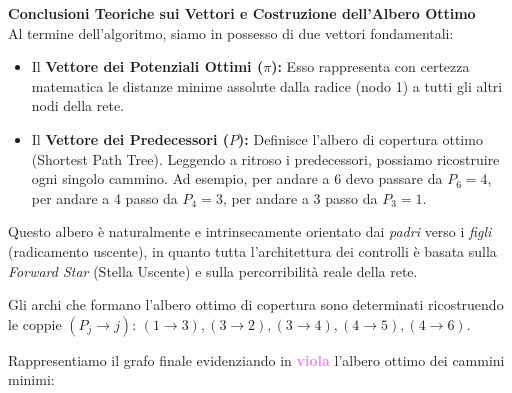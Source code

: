 \documentclass[12pt, a4paper]{article}
\begin{document}
	\textbf{Conclusioni Teoriche sui Vettori e Costruzione dell'Albero Ottimo}\\
	Al termine dell'algoritmo, siamo in possesso di due vettori fondamentali:
	\begin{itemize}
		\item Il \textbf{Vettore dei Potenziali Ottimi ($\pi$):} Esso rappresenta con certezza matematica le distanze minime assolute dalla radice (nodo 1) a tutti gli altri nodi della rete.
		\item Il \textbf{Vettore dei Predecessori ($P$):} Definisce l'albero di copertura ottimo (Shortest Path Tree). Leggendo a ritroso i predecessori, possiamo ricostruire ogni singolo cammino. Ad esempio, per andare a 6 devo passare da $P_6=4$, per andare a 4 passo da $P_4=3$, per andare a 3 passo da $P_3=1$.
	\end{itemize}
	Questo albero è naturalmente e intrinsecamente orientato dai \textit{padri} verso i \textit{figli} (radicamento uscente), in quanto tutta l'architettura dei controlli è basata sulla \textit{Forward Star} (Stella Uscente) e sulla percorribilità reale della rete.
	
	Gli archi che formano l'albero ottimo di copertura sono determinati ricostruendo le coppie $(P_j \to j)$: 
	$(1\to3), (3\to2), (3\to4), (4\to5), (4\to6)$.
	
	Rappresentiamo il grafo finale evidenziando in \textcolor{violet}{\textbf{viola}} l'albero ottimo dei cammini minimi:
	
\end{document}
